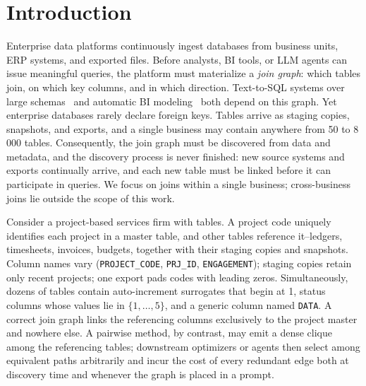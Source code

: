 \section{Introduction}
\label{sec:introduction}

Enterprise data platforms continuously ingest databases from business units, ERP systems, and exported files. Before analysts, BI tools, or LLM agents can issue meaningful queries, the platform must materialize a \emph{join graph}: which tables join, on which key columns, and in which direction. Text-to-SQL systems over large schemas~\cite{Spider2} and automatic BI modeling~\cite{AutoBI} both depend on this graph. Yet enterprise databases rarely declare foreign keys. Tables arrive as staging copies, snapshots, and exports, and a single business may contain anywhere from 50 to 8\,000 tables. Consequently, the join graph must be discovered from data and metadata, and the discovery process is never finished: new source systems and exports continually arrive, and each new table must be linked before it can participate in queries. We focus on joins within a single business; cross-business joins lie outside the scope of this work.

Consider a project-based services firm with  tables. A project code uniquely identifies each project in a master table, and  other tables reference it--ledgers, timesheets, invoices, budgets, together with their staging copies and snapshots. Column names vary (\texttt{PROJECT\_CODE}, \texttt{PRJ\_ID}, \texttt{ENGAGEMENT}); staging copies retain only recent projects; one export pads codes with leading zeros. Simultaneously, dozens of tables contain auto-increment surrogates that begin at 1, status columns whose values lie in $\{1,\dots,5\}$, and a generic column named \texttt{DATA}. A correct join graph links the  referencing columns exclusively to the project master and nowhere else. A pairwise method, by contrast, may emit a dense clique among the referencing tables; downstream optimizers or agents then select among equivalent paths arbitrarily and incur the cost of every redundant edge both at discovery time and whenever the graph is placed in a prompt.

